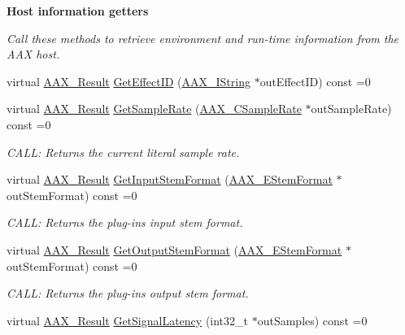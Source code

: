 \begin{Indent}\textbf{ Host information getters}\par
{\em Call these methods to retrieve environment and run-\/time information from the A\+AX host. }\begin{DoxyCompactItemize}
\item 
virtual \mbox{\hyperlink{a00392_a4d8f69a697df7f70c3a8e9b8ee130d2f}{A\+A\+X\+\_\+\+Result}} \mbox{\hyperlink{a01789_ab36371e7f7c47f30882684481285f5eb}{Get\+Effect\+ID}} (\mbox{\hyperlink{a01873}{A\+A\+X\+\_\+\+I\+String}} $\ast$out\+Effect\+ID) const =0
\item 
virtual \mbox{\hyperlink{a00392_a4d8f69a697df7f70c3a8e9b8ee130d2f}{A\+A\+X\+\_\+\+Result}} \mbox{\hyperlink{a01789_afa1f9f64eeeab9570e5599f466fa699e}{Get\+Sample\+Rate}} (\mbox{\hyperlink{a00392_a3d9eea08f47e0b0a23432e15baa4e885}{A\+A\+X\+\_\+\+C\+Sample\+Rate}} $\ast$out\+Sample\+Rate) const =0
\begin{DoxyCompactList}\small\item\em C\+A\+LL\+: Returns the current literal sample rate. \end{DoxyCompactList}\item 
virtual \mbox{\hyperlink{a00392_a4d8f69a697df7f70c3a8e9b8ee130d2f}{A\+A\+X\+\_\+\+Result}} \mbox{\hyperlink{a01789_ab024489b47d3d5d2bcd52c9859aba663}{Get\+Input\+Stem\+Format}} (\mbox{\hyperlink{a00491_ad8af5ef008b2bd478add9a0acb0a1d85}{A\+A\+X\+\_\+\+E\+Stem\+Format}} $\ast$out\+Stem\+Format) const =0
\begin{DoxyCompactList}\small\item\em C\+A\+LL\+: Returns the plug-\/in\textquotesingle{}s input stem format. \end{DoxyCompactList}\item 
virtual \mbox{\hyperlink{a00392_a4d8f69a697df7f70c3a8e9b8ee130d2f}{A\+A\+X\+\_\+\+Result}} \mbox{\hyperlink{a01789_aabe72e915df571776d4aa1c36ef8d6f2}{Get\+Output\+Stem\+Format}} (\mbox{\hyperlink{a00491_ad8af5ef008b2bd478add9a0acb0a1d85}{A\+A\+X\+\_\+\+E\+Stem\+Format}} $\ast$out\+Stem\+Format) const =0
\begin{DoxyCompactList}\small\item\em C\+A\+LL\+: Returns the plug-\/in\textquotesingle{}s output stem format. \end{DoxyCompactList}\item 
virtual \mbox{\hyperlink{a00392_a4d8f69a697df7f70c3a8e9b8ee130d2f}{A\+A\+X\+\_\+\+Result}} \mbox{\hyperlink{a01789_ad50aa6fd54e39623a58debd63d9551e1}{Get\+Signal\+Latency}} (int32\+\_\+t $\ast$out\+Samples) const =0

\end{DoxyCompactItemize}
\end{Indent}
